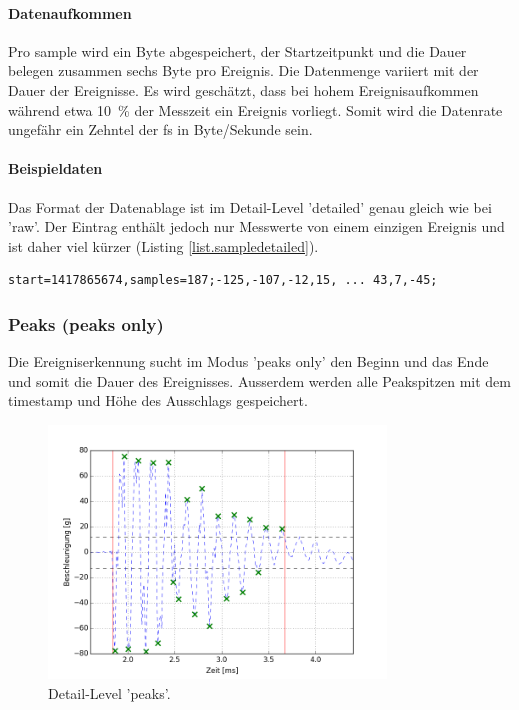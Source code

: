 \paragraph{Datenaufkommen} Pro \gls{sample} wird ein Byte abgespeichert, der Startzeitpunkt und die Dauer belegen zusammen sechs Byte pro Ereignis. Die Datenmenge variiert mit der Dauer der Ereignisse. Es wird geschätzt, dass bei hohem Ereignisaufkommen während etwa 10~\% der Messzeit ein Ereignis vorliegt. Somit wird die Datenrate ungefähr ein Zehntel der \gls{fs} in Byte/Sekunde sein.

\paragraph{Beispieldaten} Das Format der Datenablage ist im Detail-Level 'detailed' genau gleich wie bei 'raw'. Der Eintrag enthält jedoch nur Messwerte von einem einzigen Ereignis und ist daher viel kürzer (Listing \ref{list.sampledetailed}).

\begin{lstlisting}[caption=Beispieldaten auf Detail-Level 'detailed', label=list.sampledetailed]
start=1417865674,samples=187;-125,-107,-12,15, ... 43,7,-45;
\end{lstlisting}


\subsubsection{Peaks (peaks only)}
Die Ereigniserkennung sucht im Modus 'peaks only' den Beginn und das Ende und somit die Dauer des Ereignisses. Ausserdem werden alle Peakspitzen mit dem \gls{timestamp} und Höhe des Ausschlags gespeichert.
\begin{figure}
	\centering
		\includegraphics[width=0.8\textwidth]{images/peaks.png}
	\caption{Detail-Level 'peaks'.}
	\label{fig.detailpeaks}
\end{figure}

